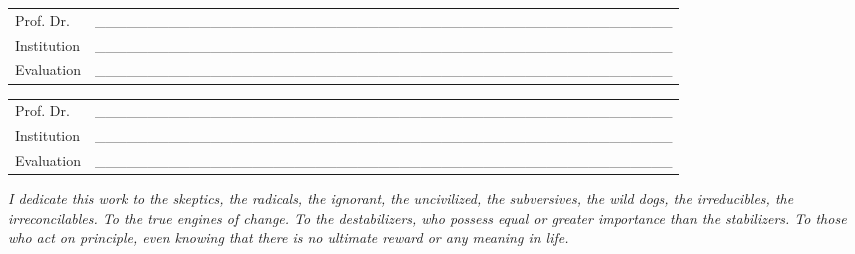 \begin{folhadeaprovacao}[\folhadeaprovacaoname]
\vspace{\smallskipamount}
\begin{tabular}{m{2cm} P{14cm}}
  Prof. Dr. & \_\_\_\_\_\_\_\_\_\_\_\_\_\_\_\_\_\_\_\_\_\_\_\_\_\_\_\_\_\_\_\_\_\_\_\_\_\_\_\_\_\_\_\_\_\_\_\_\_\_\_\_\_\_\_ \\
  Institution & \_\_\_\_\_\_\_\_\_\_\_\_\_\_\_\_\_\_\_\_\_\_\_\_\_\_\_\_\_\_\_\_\_\_\_\_\_\_\_\_\_\_\_\_\_\_\_\_\_\_\_\_\_\_\_ \\
  Evaluation & \_\_\_\_\_\_\_\_\_\_\_\_\_\_\_\_\_\_\_\_\_\_\_\_\_\_\_\_\_\_\_\_\_\_\_\_\_\_\_\_\_\_\_\_\_\_\_\_\_\_\_\_\_\_\_ \\
\end{tabular}

\vspace{\smallskipamount}
\begin{tabular}{m{2cm} P{14cm}}
  Prof. Dr. & \_\_\_\_\_\_\_\_\_\_\_\_\_\_\_\_\_\_\_\_\_\_\_\_\_\_\_\_\_\_\_\_\_\_\_\_\_\_\_\_\_\_\_\_\_\_\_\_\_\_\_\_\_\_\_ \\
  Institution & \_\_\_\_\_\_\_\_\_\_\_\_\_\_\_\_\_\_\_\_\_\_\_\_\_\_\_\_\_\_\_\_\_\_\_\_\_\_\_\_\_\_\_\_\_\_\_\_\_\_\_\_\_\_\_ \\
  Evaluation & \_\_\_\_\_\_\_\_\_\_\_\_\_\_\_\_\_\_\_\_\_\_\_\_\_\_\_\_\_\_\_\_\_\_\_\_\_\_\_\_\_\_\_\_\_\_\_\_\_\_\_\_\_\_\_ \\
\end{tabular}
\endgroup
\end{folhadeaprovacao}


\begin{dedicatoria}[] %
\vspace*{\fill} %
\centering
\textit{I dedicate this work to the skeptics, the radicals, the ignorant, the uncivilized, the subversives, the wild dogs, the irreducibles, the irreconcilables. To the true engines of change. To the destabilizers, who possess equal or greater importance than the stabilizers. To those who act on principle, even knowing that there is no ultimate reward or any meaning in life.}
\vspace*{\fill} %
\vspace{4.5cm}
\end{dedicatoria}

